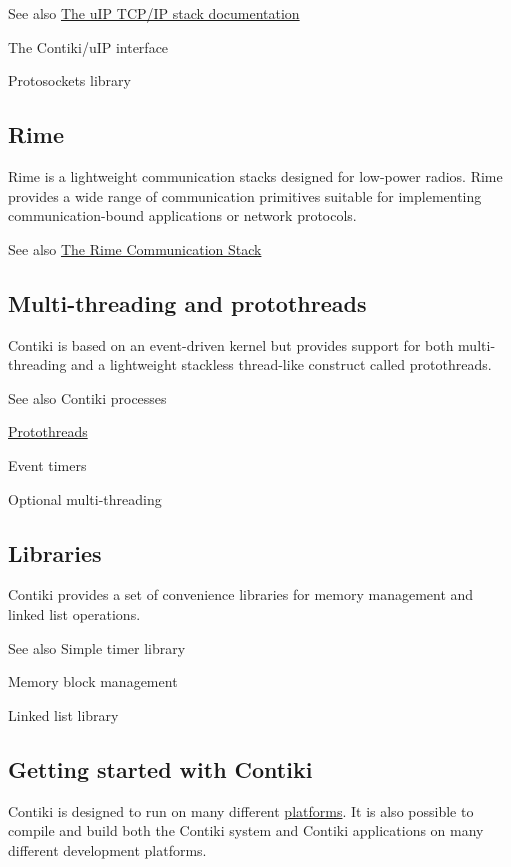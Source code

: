 \begin{DoxySeeAlso}{See also}
\hyperlink{a00074}{The u\+IP T\+C\+P/\+IP stack documentation} 

The Contiki/u\+IP interface 

Protosockets library
\end{DoxySeeAlso}
\hypertarget{index_contiki-mainpage-rime}{}\subsection{Rime}\label{index_contiki-mainpage-rime}
Rime is a lightweight communication stacks designed for low-\/power radios. Rime provides a wide range of communication primitives suitable for implementing communication-\/bound applications or network protocols.

\begin{DoxySeeAlso}{See also}
\hyperlink{a00068}{The Rime Communication Stack}
\end{DoxySeeAlso}
\hypertarget{index_contiki-mainpage-threads}{}\subsection{Multi-\/threading and protothreads}\label{index_contiki-mainpage-threads}
Contiki is based on an event-\/driven kernel but provides support for both multi-\/threading and a lightweight stackless thread-\/like construct called protothreads.

\begin{DoxySeeAlso}{See also}
Contiki processes 

\hyperlink{a00066}{Protothreads} 

Event timers 

Optional multi-\/threading
\end{DoxySeeAlso}
\hypertarget{index_contiki-mainpage-lib}{}\subsection{Libraries}\label{index_contiki-mainpage-lib}
Contiki provides a set of convenience libraries for memory management and linked list operations.

\begin{DoxySeeAlso}{See also}
Simple timer library 

Memory block management 

Linked list library
\end{DoxySeeAlso}
\hypertarget{index_contiki-mainpage-getting-started}{}\subsection{Getting started with Contiki}\label{index_contiki-mainpage-getting-started}
Contiki is designed to run on many different \hyperlink{a00065}{platforms}. It is also possible to compile and build both the Contiki system and Contiki applications on many different development platforms.

